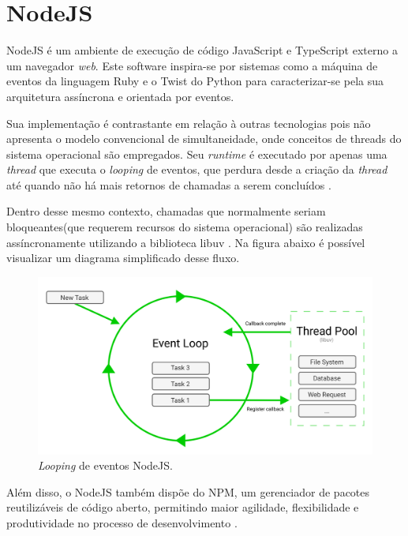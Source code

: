 \section{NodeJS}
\label{sec:nodejs}
NodeJS é um ambiente de execução de código JavaScript e TypeScript externo a um navegador \textit{web}. Este software inspira-se por sistemas como a máquina de eventos da linguagem Ruby e o Twist do  Python para caracterizar-se pela sua arquitetura assíncrona e orientada por eventos. 

Sua implementação é contrastante em relação à outras tecnologias pois não apresenta o modelo convencional de simultaneidade, onde conceitos de threads do sistema operacional são empregados.  Seu \textit{runtime} é executado por apenas uma \textit{thread} que executa o \textit{looping} de eventos, que perdura desde a criação da \textit{thread} até quando não há mais retornos de chamadas a serem concluídos \cite{Foundation2023}.

Dentro desse mesmo contexto, chamadas que normalmente seriam bloqueantes(que requerem recursos do sistema operacional) são realizadas assíncronamente utilizando a biblioteca libuv \cite{ClaudioWunder}. Na figura abaixo é possível visualizar um diagrama simplificado desse fluxo.

\begin{figure}[H]
    \centering
    \caption{\textit{Looping} de eventos NodeJS.}
    \label{fig:nodejs}
    \includegraphics[width=.8\textwidth]{data/figures/nodejs.png}
\end{figure}

Além disso, o NodeJS também dispõe do NPM, um gerenciador de pacotes reutilizáveis de código aberto, permitindo maior agilidade, flexibilidade e produtividade no processo de desenvolvimento \cite{npm2022}.